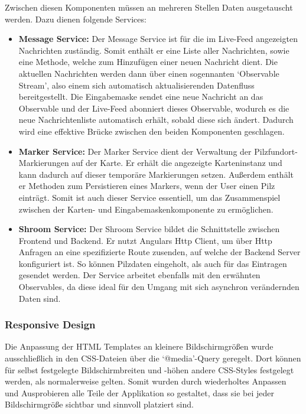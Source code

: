 Zwischen diesen Komponenten müssen an mehreren Stellen Daten ausgetauscht werden. Dazu dienen folgende Services:

\begin{itemize}

	\item \textbf{Message Service:}
	      Der Message Service ist für die im Live-Feed angezeigten Nachrichten zuständig. Somit enthält er eine Liste aller Nachrichten, sowie eine Methode,
	      welche zum Hinzufügen einer neuen Nachricht dient. Die aktuellen Nachrichten werden dann über einen sogennanten `Observable Stream', also einem
	      sich automatisch aktualisierenden Datenfluss bereitgestellt. Die Eingabemaske sendet eine neue Nachricht an das Observable und der Live-Feed
	      abonniert dieses Observable, wodurch es die neue Nachrichtenliste automatisch erhält, sobald diese sich ändert. Dadurch wird eine effektive
	      Brücke zwischen den beiden Komponenten geschlagen.

	\item \textbf{Marker Service:}
	      Der Marker Service dient der Verwaltung der Pilzfundort-Markierungen auf der Karte. Er erhält die angezeigte Karteninstanz und kann dadurch auf
	      dieser temporäre Markierungen setzen. Außerdem enthält er Methoden zum Persistieren eines Markers, wenn der User einen Pilz einträgt. Somit ist
	      auch dieser Service essentiell, um das Zusammenspiel zwischen der Karten- und Eingabemaskenkomponente zu ermöglichen.

	\item \textbf{Shroom Service:}
	      Der Shroom Service bildet die Schnittstelle zwischen Frontend und Backend. Er nutzt Angulars Http Client, um über Http Anfragen an eine spezifizierte
	      Route zusenden, auf welche der Backend Server konfiguriert ist. So können Pilzdaten eingeholt, als auch für das Eintragen gesendet werden. Der Service
	      arbeitet ebenfalls mit den erwähnten Observables, da diese ideal für den Umgang mit sich asynchron verändernden Daten sind.

\end{itemize}

\subsubsection{Responsive Design}

Die Anpassung der HTML Templates an kleinere Bildschirmgrößen wurde ausschließlich in den CSS-Dateien über die `@media'-Query geregelt. Dort können für
selbst festgelegte Bildschirmbreiten und -höhen andere CSS-Styles festgelegt werden, als normalerweise gelten. Somit wurden durch wiederholtes Anpassen
und Ausprobieren alle Teile der Applikation so gestaltet, dass sie bei jeder Bildschirmgröße sichtbar und sinnvoll platziert sind.

